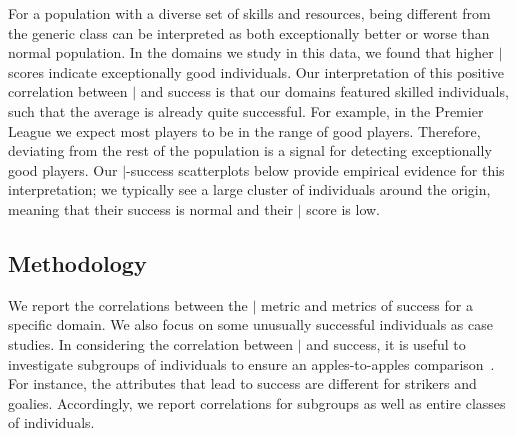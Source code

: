 \begin{table}[htbp]
	
	\centering
		\caption{Success metrics and their distributions.\label{table:metrics}}	
	\end{table}
	
	
	
	For a population with a diverse set of skills and resources,
	being different from the generic class can be interpreted as both exceptionally better or worse than normal population. In the domains we study in this data, we found that higher $\mid$ scores indicate exceptionally good individuals. Our interpretation of this positive correlation between $\mid$ and success is that our domains featured skilled individuals, such that the average is already quite successful. 
	For example, in the Premier League we expect most players to be in the range of good players. Therefore, deviating from the rest of the population is a signal for detecting exceptionally good players. Our $\mid$-success scatterplots below provide empirical evidence for this interpretation; we typically see a large cluster of individuals around the origin, meaning that their success is normal and their $\mid$ score is low.
	
	\subsection{Methodology}
	
	We report the correlations between the $\mid$ metric and metrics of success for a specific domain. We also focus on some unusually successful individuals as case studies. 
	In considering the correlation between $\mid$ and success, it is useful to investigate subgroups of individuals to ensure an apples-to-apples comparison~\cite{Sun2009}. For instance, the attributes that lead to success are different for strikers and goalies.  Accordingly, we report correlations for subgroups as well as entire classes of individuals. 
	
